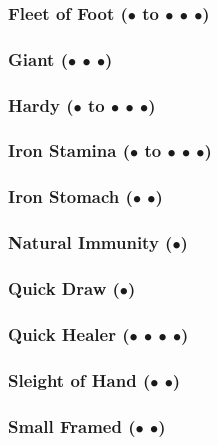 \documentclass["../Misguided by Starlight.tex"]{subfiles}
\begin{document}
	\subsubsection{Fleet of Foot ($\bullet$ to $\bullet$ $\bullet$ $\bullet$)} %
	
	\subsubsection{Giant ($\bullet$ $\bullet$ $\bullet$)} %
	
	\subsubsection{Hardy ($\bullet$ to $\bullet$ $\bullet$ $\bullet$)} %
	
	\subsubsection{Iron Stamina ($\bullet$ to $\bullet$ $\bullet$ $\bullet$)} %
	
	\subsubsection{Iron Stomach ($\bullet$ $\bullet$)} %
	
	\subsubsection{Natural Immunity ($\bullet$)} %
	
	\subsubsection{Quick Draw ($\bullet$)} %
	
	\subsubsection{Quick Healer ($\bullet$ $\bullet$ $\bullet$ $\bullet$)} %
	
	\subsubsection{Sleight of Hand ($\bullet$ $\bullet$)} %
	
	\subsubsection{Small Framed ($\bullet$ $\bullet$)} %
	
\end{document}
